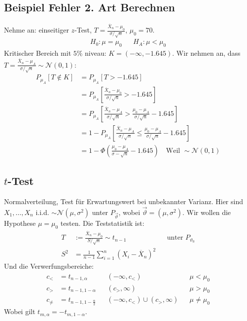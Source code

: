 \documentclass[8pt]{extarticle}
\newcommand{\vt}{\vartheta}
\newcommand{\Sn}{\sum_{i = 1}^n}
\newcommand{\zufallsvariablen}{X_1, \dots, X_n}
\newcommand{\Normalverteilt}{\mathcal{N}(\mu, \sigma^2)}
\newcommand{\Standardnormalverteilt}{\mathcal{N}(0, 1)}
\begin{document}
\begin{multicols*}{3}
  \subsection*{Beispiel Fehler 2. Art Berechnen}
  Nehme an: einseitiger $z$-Test,
  $T = \frac{\overline{X}_n - \mu_0}{\sigma / \sqrt{n}}$, $\mu_0 = 70$.
  \begin{align*}
    H_0 : \mu = \mu_0 &  & H_A : \mu < \mu_0
  \end{align*}
  Kritischer Bereich mit $5$\% niveau: $K = (- \infty, -1.645)$. Wir
  nehmen an, dass $T = \frac{\overline{X}_n - \mu_A}{\sigma / \sqrt{n}} \sim \Standardnormalverteilt$:
  \begin{align*}
    P_{\mu_A}[T \not \in K]
     & = P_{\mu_A}[T > -1.645]                                                                                                            \\
     & = P_{\mu_A} \left[\frac{\overline{X}_n - \mu_0}{\sigma / \sqrt{n}} > -1.645 \right]                                                \\
     & = P_{\mu_A} \left[\frac{\overline{X}_n - \mu_A}{\sigma / \sqrt{n}} > \frac{\mu_0 - \mu_A}{\sigma / \sqrt{n}} -1.645 \right]        \\
     & = 1 - P_{\mu_A} \left[\frac{\overline{X}_n - \mu_A}{\sigma / \sqrt{n}} \leq \frac{\mu_0 - \mu_A}{\sigma / \sqrt{n}} -1.645 \right] \\
     & = 1 - \Phi \left( \frac{\mu_0 - \mu_A}{\sigma - \sqrt{n}} - 1.645 \right)       \quad \text{Weil } \sim \Standardnormalverteilt
  \end{align*}
  \subsection*{$t$-Test}
  Normalverteilung, Test für Erwartungswert bei unbekannter Varianz. Hier sind
  $\zufallsvariablen$ i.i.d. $\sim \Normalverteilt$ unter $P_{\vec{\vt}}$,
  wobei $\vec{\vt} = (\mu, \sigma^2)$. Wir wollen die Hypothese $\mu = \mu_0$
  testen. Die Teststatistik ist:
  \begin{align*}
    T   & := \frac{\overline{X}_n - \mu_0}{S / \sqrt{n}} \sim t_{n-1}
        &                                                             & \text{unter } P_{\vt_0} \\
    S^2 & = \frac{1}{n-1} \Sn (X_i - \overline{X}_n)^2
  \end{align*}
  Und die Verwerfungsbereiche:
  \begin{align*}
    c_<      & = t_{n-1, \alpha}               &  & (-\infty, c_<)                    &  & \mu < \mu_0    \\
    c_>      & = t_{n-1, 1 - \alpha}           &  & (c_>, \infty)                     &  & \mu > \mu_0    \\
    c_{\neq} & = t_{n-1, 1 - \frac{\alpha}{2}} &  & (-\infty, c_<) \cup (c_>, \infty) &  & \mu \neq \mu_0
  \end{align*}
  Wobei gilt $t_{m, \alpha} = -t_{m, 1 - \alpha}$.

\end{multicols*}
\end{document}
